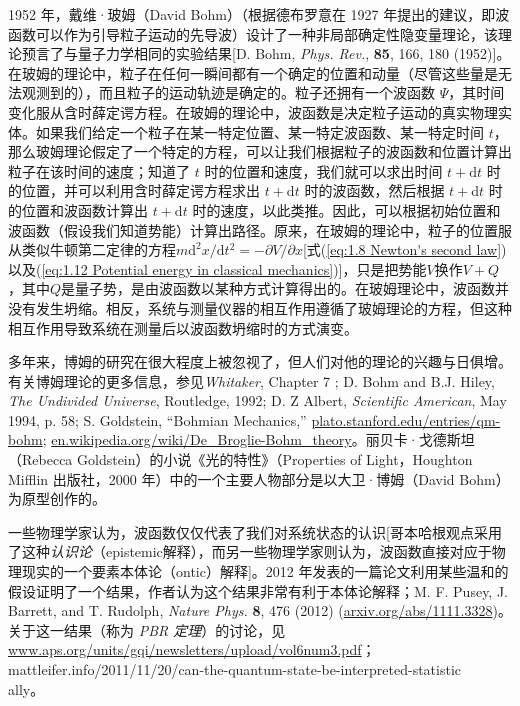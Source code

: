     1952 年，戴维·玻姆（David Bohm）（根据德布罗意在 1927 年提出的建议，即波函数可以作为引导粒子运动的先导波）设计了一种非局部确定性隐变量理论，该理论预言了与量子力学相同的实验结果[D. Bohm, \textit{Phys. Rev.}, \textbf{85}, 166, 180 (1952)]。在玻姆的理论中，粒子在任何一瞬间都有一个确定的位置和动量（尽管这些量是无法观测到的），而且粒子的运动轨迹是确定的。粒子还拥有一个波函数 $\Psi$，其时间变化服从含时薛定谔方程。在玻姆的理论中，波函数是决定粒子运动的真实物理实体。如果我们给定一个粒子在某一特定位置、某一特定波函数、某一特定时间 $t$，那么玻姆理论假定了一个特定的方程，可以让我们根据粒子的波函数和位置计算出粒子在该时间的速度；知道了 $t$ 时的位置和速度，我们就可以求出时间 $t+\mathrm{d}t$ 时的位置，并可以利用含时薛定谔方程求出 $t+\mathrm{d}t$ 时的波函数，然后根据 $t+\mathrm{d}t$ 时的位置和波函数计算出 $t+\mathrm{d}t$ 时的速度，以此类推。因此，可以根据初始位置和波函数（假设我们知道势能）计算出路径。原来，在玻姆的理论中，粒子的位置服从类似牛顿第二定律的方程$m \mathrm{d}^2x/\mathrm{d}t^2 = -\partial V /\partial x$[式(\ref{eq:1.8 Newton's second law})以及(\ref{eq:1.12 Potential energy in classical mechanics})]，只是把势能$V$换作$V+Q$，其中$Q$是量子势，是由波函数以某种方式计算得出的。在玻姆理论中，波函数并没有发生坍缩。相反，系统与测量仪器的相互作用遵循了玻姆理论的方程，但这种相互作用导致系统在测量后以波函数坍缩时的方式演变。

    多年来，博姆的研究在很大程度上被忽视了，但人们对他的理论的兴趣与日俱增。有关博姆理论的更多信息，参见\textit{Whitaker}, Chapter 7 ; D. Bohm and B.J. Hiley, \textit{The Undivided Universe}, Routledge, 1992; D. Z Albert, \textit{Scientific American}, May 1994, p. 58; S. Goldstein, “Bohmian Mechanics,” \url{plato.stanford.edu/entries/qm-bohm}; \url{en.wikipedia.org/wiki/De_Broglie-Bohm_theory}。丽贝卡·戈德斯坦（Rebecca Goldstein）的小说《光的特性》（Properties of Light，Houghton Mifflin 出版社，2000 年）中的一个主要人物部分是以大卫·博姆（David Bohm）为原型创作的。

    一些物理学家认为，波函数仅仅代表了我们对系统状态的认识[哥本哈根观点采用了这种\textit{认识论}（epistemic解释），而另一些物理学家则认为，波函数直接对应于物理现实的一个要素本体论（ontic）解释]。2012 年发表的一篇论文利用某些温和的假设证明了一个结果，作者认为这个结果非常有利于本体论解释；M. F. Pusey, J. Barrett, and T. Rudolph, \textit{Nature Phys.} \textbf{8}, 476 (2012) (\url{arxiv.org/abs/1111.3328})。关于这一结果（称为 \textit{PBR 定理}）的讨论，见 \url{www.aps.org/units/gqi/newsletters/upload/vol6num3.pdf}；mattleifer.info/2011/11/20/can-the-quantum-state-be-interpreted-statistic\\ally。

